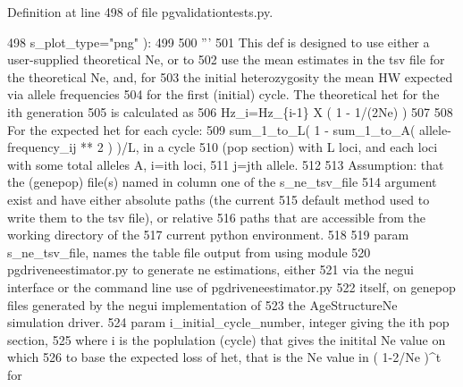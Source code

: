 Definition at line 498 of file pgvalidationtests.\+py.


\begin{DoxyCode}
498                                             s\_plot\_type=\textcolor{stringliteral}{"png"} ):
499 
500     \textcolor{stringliteral}{'''}
501 \textcolor{stringliteral}{    This def is designed to use either a user-supplied theoretical Ne, or to}
502 \textcolor{stringliteral}{    use the mean estimates in the tsv file for the theoretical Ne, and, for}
503 \textcolor{stringliteral}{    the initial heterozygosity the mean HW expected via allele frequencies}
504 \textcolor{stringliteral}{    for the first (initial) cycle.  The theoretical het for the ith generation}
505 \textcolor{stringliteral}{    is calculated as}
506 \textcolor{stringliteral}{        Hz\_i=Hz\_\{i-1\} X ( 1 - 1/(2Ne) )}
507 \textcolor{stringliteral}{}
508 \textcolor{stringliteral}{    For the expected het for each cycle:}
509 \textcolor{stringliteral}{            sum\_1\_to\_L(  1 - sum\_1\_to\_A( allele-frequency\_ij ** 2 ) )/L, in a cycle}
510 \textcolor{stringliteral}{            (pop section) with L loci, and each loci with some total alleles A, i=ith loci,}
511 \textcolor{stringliteral}{            j=jth allele.}
512 \textcolor{stringliteral}{}
513 \textcolor{stringliteral}{    Assumption:  that the (genepop) file(s) named in column one of the s\_ne\_tsv\_file }
514 \textcolor{stringliteral}{            argument exist and have either absolute paths (the current}
515 \textcolor{stringliteral}{            default method used to write them to the tsv file), or relative}
516 \textcolor{stringliteral}{            paths that are accessible from the working directory of the}
517 \textcolor{stringliteral}{            current python environment.}
518 \textcolor{stringliteral}{}
519 \textcolor{stringliteral}{    param s\_ne\_tsv\_file, names the table file output from using module}
520 \textcolor{stringliteral}{        pgdriveneestimator.py to generate ne estimations, either}
521 \textcolor{stringliteral}{        via the negui interface or the command line use of pgdriveneestimator.py }
522 \textcolor{stringliteral}{        itself, on genepop files generated by the negui implementation of}
523 \textcolor{stringliteral}{        the AgeStructureNe simulation driver.}
524 \textcolor{stringliteral}{    param i\_initial\_cycle\_number, integer giving the ith pop section,}
525 \textcolor{stringliteral}{        where i is the poplulation (cycle) that gives the initital Ne value on which}
526 \textcolor{stringliteral}{        to base the expected loss of het, that is the Ne value in ( 1-2/Ne )^t for}

\end{DoxyCode}
